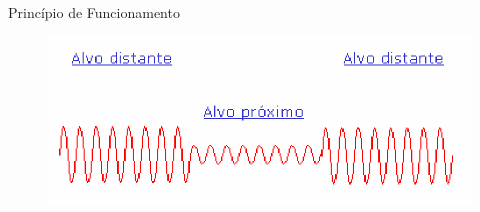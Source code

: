 \documentclass[aspectratio=169,
				xcolor=table]{beamer}
\begin{document}
		\begin{frame}{Princípio de Funcionamento}
			\begin{figure}
				\centering
				\includegraphics[scale=.4]{../figs/cap03/Imagem17}	
			\end{figure}			
		\end{frame}
		
%		
		
\end{document}
